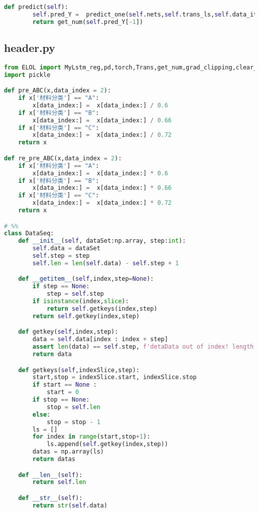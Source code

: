 \begin{appendices}
\begin{lstlisting}[language=python]
    def predict(self):
        self.pred_Y =  predict_one(self.nets,self.trans_ls,self.data_iter)
        return get_num(self.pred_Y[-1])


\end{lstlisting}

\subsection{header.py}

\begin{lstlisting}[language=python]
from ELOL import MyLstm_reg,pd,torch,Trans,get_num,grad_clipping,clear_output,plt,np
import pickle

def pre_ABC(x,data_index = 2):
    if x['材料分类'] == "A":
        x[data_index:] =  x[data_index:] / 0.6
    if x['材料分类'] == "B":
        x[data_index:] =  x[data_index:] / 0.66
    if x['材料分类'] == "C":
        x[data_index:] =  x[data_index:] / 0.72
    return x

def re_pre_ABC(x,data_index = 2):
    if x['材料分类'] == "A":
        x[data_index:] =  x[data_index:] * 0.6
    if x['材料分类'] == "B":
        x[data_index:] =  x[data_index:] * 0.66
    if x['材料分类'] == "C":
        x[data_index:] =  x[data_index:] * 0.72
    return x

# %%
class DataSeq:
    def __init__(self, dataSet:np.array, step:int):
        self.data = dataSet
        self.step = step
        self.len = len(self.data) - self.step + 1

    def __getitem__(self,index,step=None):
        if step == None:
            step = self.step
        if isinstance(index,slice):
            return self.getkeys(index,step)
        return self.getkey(index,step)

    def getkey(self,index,step):
        data = self.data[index : index + step]
        assert len(data) == self.step, f'detaData out of index! length is {self.len} but index is {index}'
        return data

    def getkeys(self,indexSlice,step):
        start,stop = indexSlice.start, indexSlice.stop
        if start == None :
            start = 0
        if stop == None:
            stop = self.len
        else:
            stop = stop - 1
        ls = []
        for index in range(start,stop+1):
            ls.append(self.getkey(index,step))
        datas = np.array(ls)
        return datas

    def __len__(self):
        return self.len

    def __str__(self):
        return str(self.data)


\end{lstlisting}
\end{appendices}
